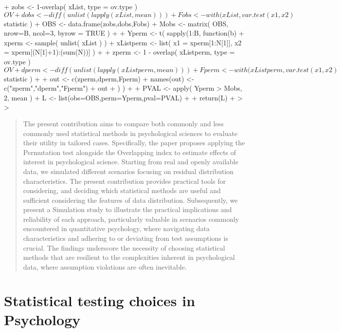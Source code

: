 \documentclass[twocolumn]{article}
\begin{document}
\begin{Schunk}
\begin{Sinput}
{+   zobs <- 1-overlap( xList, type = ov.type )$OV
+   dobs <- diff( unlist( lapply(xList, mean) ) )
+   Fobs <-  with( xList, var.test(x1,x2)$statistic )
+   OBS <- data.frame(zobs,dobs,Fobs)
+   Mobs <- matrix( OBS, nrow=B, ncol=3, byrow = TRUE )
+   
+   Yperm <- t( sapply(1:B, function(b){
+     xperm <- sample( unlist( xList ) )
+     xListperm <- list( x1 = xperm[1:N[1]], x2 = xperm[(N[1]+1):(sum(N))] )
+     
+     zperm <- 1 - overlap( xListperm, type = ov.type )$OV
+     dperm <- diff( unlist( lapply(xListperm, mean) ) )
+     Fperm <-  with( xListperm, var.test(x1,x2)$statistic )
+     
+     out <- c(zperm,dperm,Fperm)
+     names(out) <- c("zperm","dperm","Fperm")
+     out
+   }) )
+   
+   PVAL <- apply( Yperm > Mobs, 2, mean )
+   L <- list(obs=OBS,perm=Yperm,pval=PVAL)
+   
+   return(L)
+ }
> 
> 
\end{Sinput}
\end{Schunk}

\begin{abstract}
The present contribution aims to compare both commonly and less commonly used statistical methods in psychological sciences to evaluate their utility in tailored cases. Specifically, the paper proposes applying the Permutation test alongside the Overlapping index to estimate effects of interest in psychological science. Starting from real and openly available data, we simulated different scenarios focusing on residual distribution characteristics.  The present contribution provides practical tools for considering, and deciding which statistical methods are useful and sufficient considering the features of data distribution. Subsequently, we present a Simulation study to illustrate the practical implications and reliability of each approach, particularly valuable in scenarios commonly encountered in quantitative psychology, where navigating data characteristics and adhering to or deviating from test assumptions is crucial. The findings underscore the necessity of choosing statistical methods that are resilient to the complexities inherent in psychological data, where assumption violations are often inevitable.
\end{abstract}


\section{Statistical testing choices in Psychology}
\end{document}
